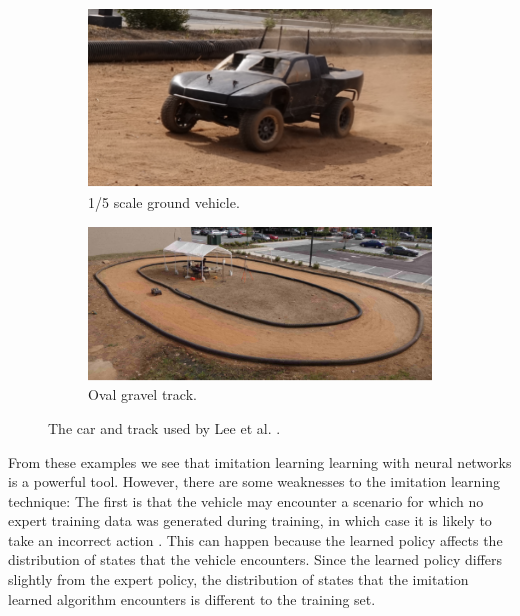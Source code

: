 \begin{figure}[htb!]
    \centering
    \begin{subfigure}[htb!]{0.48\textwidth}
        \centering
        \includegraphics[height=.45\linewidth]{contents/chapt2/figs/IL_car.png}
        \caption[1/5 scale ground vehicle]{1/5 scale ground vehicle.}
        \label{fig:IL_car}
    \end{subfigure}
    \hfill
    \begin{subfigure}[htb!]{0.48\textwidth}
        \centering
        \includegraphics[height=.45\linewidth]{contents/chapt2/figs/IL_track.png}
        \caption[Oval gravel track]{Oval gravel track.}
        \label{fig:IL_track}
    \end{subfigure}
    \hfill
    \caption[The car and track used by Lee et al.]{The car and track used by Lee et al. \cite{lee2019}.}
\label{fig:lee_car_track}
\end{figure}


From these examples we see that imitation learning learning with neural networks is a powerful tool.
However, there are some weaknesses to the imitation learning technique:
The first is that the vehicle may encounter a scenario for which no expert training data was generated during training, in which case it is likely to take an incorrect action \cite{Osa_2018}.
This can happen because the learned policy affects the distribution of states that the vehicle encounters.
Since the learned policy differs slightly from the expert policy, the distribution of states that the imitation learned algorithm encounters is different to the training set.

